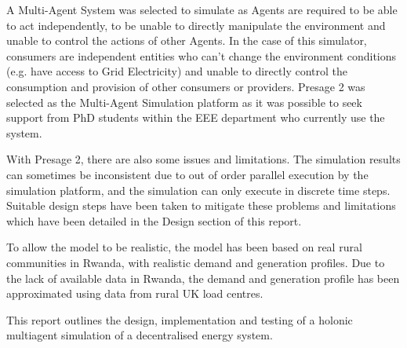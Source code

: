 A Multi-Agent System was selected to simulate as Agents are required to be able to act independently, to be unable to directly manipulate the environment and unable to control the actions of other Agents. In the case of this simulator, consumers are independent entities who can't change the environment conditions (e.g. have access to Grid Electricity) and unable to directly control the consumption and provision of other consumers or providers. Presage 2 was selected as the Multi-Agent Simulation platform as it was possible to seek support from PhD students within the EEE department who currently use the system.

With Presage 2, there are also some issues and limitations. The simulation results can sometimes be inconsistent due to out of order parallel execution by the simulation platform, and the simulation can only execute in discrete time steps. Suitable design steps have been taken to mitigate these problems and limitations which have been detailed in the Design section of this report. 

To allow the model to be realistic, the model has been based on real rural communities in Rwanda, with realistic demand and generation profiles. Due to the lack of available data in Rwanda, the demand and generation profile has been approximated using data from rural UK load centres.

This report outlines the design, implementation and testing of a holonic multiagent simulation of a decentralised energy system. 
